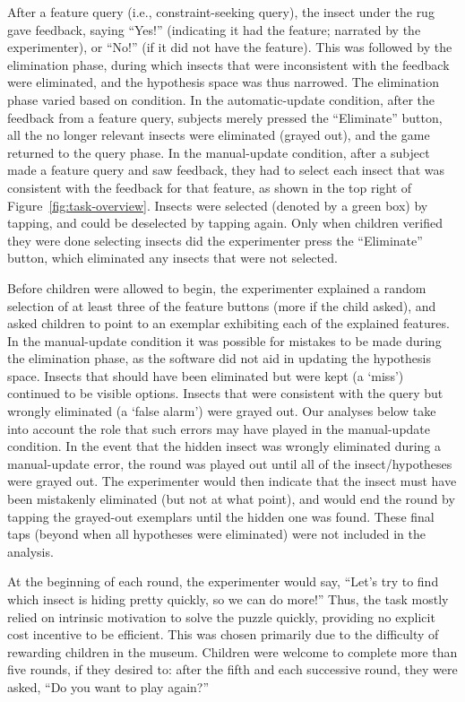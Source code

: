 \documentclass[man,floatsintext]{apa6}
\begin{document}
After a feature query (i.e., constraint-seeking query), the insect under the rug gave feedback, saying 
``Yes!'' (indicating it had the feature; narrated by the experimenter), or ``No!'' (if it did not have 
the feature). This was followed by the elimination phase, during which insects that were 
inconsistent with the feedback were eliminated, and the hypothesis space was thus narrowed. 
The elimination phase varied based on condition.
 In the automatic-update condition, after the feedback from a 
feature query, subjects merely pressed the ``Eliminate'' button, all the no longer relevant insects 
were eliminated (grayed out), and the game returned to the query phase. In the 
manual-update condition, after a subject made a feature query and saw feedback, 
they had to select each insect that was consistent with the feedback for that feature, as 
shown in the top right of Figure~\ref{fig:task-overview}. Insects were selected (denoted by a green box) by 
tapping, and could be deselected by tapping again. Only when children verified they were done 
selecting insects did the experimenter press the ``Eliminate'' button, which eliminated 
any insects that were not selected. 

Before children were allowed to begin, the experimenter explained a random selection of at least three of the feature 
buttons (more if the child asked), and asked children to point to an exemplar exhibiting each of the explained features. 
In the manual-update condition it was possible for mistakes to be made
during the elimination phase, as the software did not aid in updating the hypothesis space. Insects that should have been eliminated but were kept (a `miss') 
continued to be visible options.  Insects that were consistent with the query but wrongly eliminated (a `false alarm') 
were grayed out.   Our analyses below take into account
the role that such errors may have played in the manual-update condition.
In the event that the hidden insect was wrongly eliminated during a manual-update error, 
the round was played out until all of the insect/hypotheses were grayed out. The experimenter would then indicate 
that the insect must have been mistakenly eliminated (but not at what point), and would end the round by 
tapping the grayed-out exemplars until the hidden one was found. These final taps (beyond when all 
hypotheses were eliminated) were not included in the analysis.  

At the beginning of each round, the experimenter would say, ``Let's try to find which insect is hiding pretty 
quickly, so we can do more!'' Thus, the task mostly relied on intrinsic motivation to solve the puzzle quickly, 
providing no explicit cost incentive to be efficient. This was chosen primarily due to the difficulty of rewarding
children in the museum.  Children were welcome to complete more than five rounds, 
if they desired to: after the fifth and each successive round, they were asked, ``Do you want to play again?''
\end{document}
